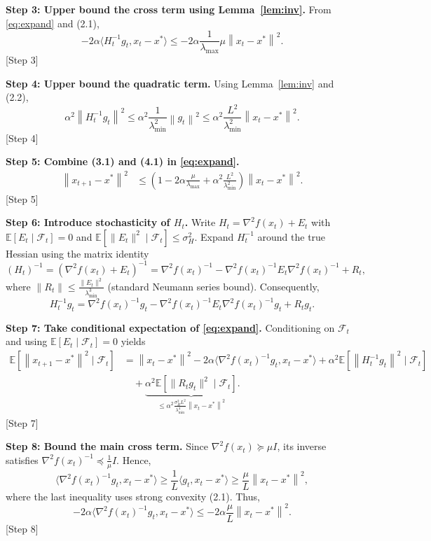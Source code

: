 \documentclass[11pt]{article}
\newcommand{\E}{\mathbb{E}}
\newcommand{\norm}[1]{\left\|#1\right\|}
\newcommand{\ip}[2]{\langle #1,#2\rangle}
\begin{document}
\bigskip
\noindent\textbf{Step 3: Upper bound the cross term using Lemma~\ref{lem:inv}.}  
From \eqref{eq:expand} and (2.1),
\[
-2\alpha\ip{H_{t}^{-1}g_{t}}{x_{t}-x^{*}}
\le -2\alpha\frac{1}{\lambda_{\max}}\mu\norm{x_{t}-x^{*}}^{2}. \tag{3.1}
\]
[Step 3]

\bigskip
\noindent\textbf{Step 4: Upper bound the quadratic term.}  
Using Lemma~\ref{lem:inv} and (2.2),
\[
\alpha^{2}\norm{H_{t}^{-1}g_{t}}^{2}
\le \alpha^{2}\frac{1}{\lambda_{\min}^{2}}\norm{g_{t}}^{2}
\le \alpha^{2}\frac{L^{2}}{\lambda_{\min}^{2}}\norm{x_{t}-x^{*}}^{2}. \tag{4.1}
\]
[Step 4]

\bigskip
\noindent\textbf{Step 5: Combine (3.1) and (4.1) in \eqref{eq:expand}.}  
\begin{align}
\norm{x_{t+1}-x^{*}}^{2}
&\le \left(1-2\alpha\frac{\mu}{\lambda_{\max}}+\alpha^{2}\frac{L^{2}}{\lambda_{\min}^{2}}\right)\norm{x_{t}-x^{*}}^{2}. \label{eq:deterministic}
\end{align}
[Step 5]

\bigskip
\noindent\textbf{Step 6: Introduce stochasticity of $H_{t}$.}  
Write $H_{t}= \nabla^{2}f(x_{t})+E_{t}$ with $\E[E_{t}\mid\mathcal{F}_{t}]=0$ and $\E[\|E_{t}\|^{2}\mid\mathcal{F}_{t}]\le\sigma_{H}^{2}$.  
Expand $H_{t}^{-1}$ around the true Hessian using the matrix identity
\[
(H_{t})^{-1}= (\nabla^{2}f(x_{t})+E_{t})^{-1}
= \nabla^{2}f(x_{t})^{-1} - \nabla^{2}f(x_{t})^{-1}E_{t}\nabla^{2}f(x_{t})^{-1}+R_{t},
\]
where $\|R_{t}\|\le \frac{\|E_{t}\|^{2}}{\lambda_{\min}^{3}}$ (standard Neumann series bound).  
Consequently,
\[
H_{t}^{-1}g_{t}= \nabla^{2}f(x_{t})^{-1}g_{t} - \nabla^{2}f(x_{t})^{-1}E_{t}\nabla^{2}f(x_{t})^{-1}g_{t}+R_{t}g_{t}.
\]

\bigskip
\noindent\textbf{Step 7: Take conditional expectation of \eqref{eq:expand}.}  
Conditioning on $\mathcal{F}_{t}$ and using $\E[E_{t}\mid\mathcal{F}_{t}]=0$ yields
\begin{align}
\E\!\left[\norm{x_{t+1}-x^{*}}^{2}\mid\mathcal{F}_{t}\right]
&= \norm{x_{t}-x^{*}}^{2}
-2\alpha\ip{\nabla^{2}f(x_{t})^{-1}g_{t}}{x_{t}-x^{*}}
+\alpha^{2}\E\!\left[\norm{H_{t}^{-1}g_{t}}^{2}\mid\mathcal{F}_{t}\right] \nonumber\\
&\quad +\underbrace{\alpha^{2}\E\!\left[\|R_{t}g_{t}\|^{2}\mid\mathcal{F}_{t}\right]}_{\le \alpha^{2}\frac{\sigma_{H}^{2}L^{2}}{\lambda_{\min}^{4}}\norm{x_{t}-x^{*}}^{2}}. \tag{7.1}
\end{align}
[Step 7]

\bigskip
\noindent\textbf{Step 8: Bound the main cross term.}  
Since $\nabla^{2}f(x_{t})\succeq \mu I$, its inverse satisfies $\nabla^{2}f(x_{t})^{-1}\preceq \frac{1}{\mu}I$. Hence,
\[
\ip{\nabla^{2}f(x_{t})^{-1}g_{t}}{x_{t}-x^{*}}
\ge \frac{1}{L}\ip{g_{t}}{x_{t}-x^{*}}
\ge \frac{\mu}{L}\norm{x_{t}-x^{*}}^{2},
\]
where the last inequality uses strong convexity (2.1).  
Thus,
\[
-2\alpha\ip{\nabla^{2}f(x_{t})^{-1}g_{t}}{x_{t}-x^{*}}
\le -2\alpha\frac{\mu}{L}\norm{x_{t}-x^{*}}^{2}. \tag{8.1}
\]
[Step 8]
\end{document}
